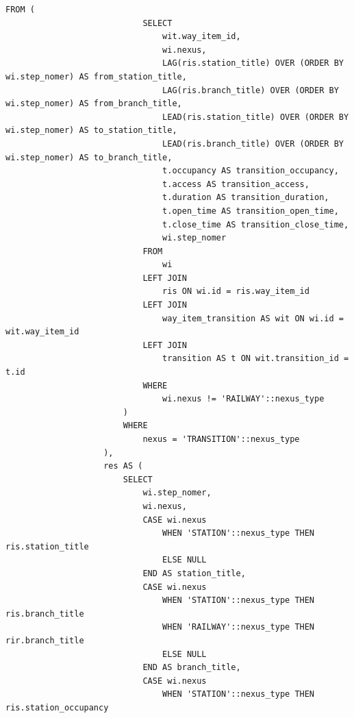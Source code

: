 \clearpage

\begin{lstlisting}[label=lst:get_route_json_by_id:3,caption=Реализация функции получения маршрута (часть 3),firstnumber=90]
                        FROM (
                            SELECT
                                wit.way_item_id,
                                wi.nexus,
                                LAG(ris.station_title) OVER (ORDER BY wi.step_nomer) AS from_station_title,
                                LAG(ris.branch_title) OVER (ORDER BY wi.step_nomer) AS from_branch_title,
                                LEAD(ris.station_title) OVER (ORDER BY wi.step_nomer) AS to_station_title,
                                LEAD(ris.branch_title) OVER (ORDER BY wi.step_nomer) AS to_branch_title,
                                t.occupancy AS transition_occupancy,
                                t.access AS transition_access,
                                t.duration AS transition_duration,
                                t.open_time AS transition_open_time,
                                t.close_time AS transition_close_time,
                                wi.step_nomer
                            FROM
                                wi
                            LEFT JOIN
                                ris ON wi.id = ris.way_item_id
                            LEFT JOIN
                                way_item_transition AS wit ON wi.id = wit.way_item_id
                            LEFT JOIN
                                transition AS t ON wit.transition_id = t.id
                            WHERE
                                wi.nexus != 'RAILWAY'::nexus_type
                        )
                        WHERE
                            nexus = 'TRANSITION'::nexus_type
                    ),
                    res AS (
                        SELECT
                            wi.step_nomer,
                            wi.nexus,
                            CASE wi.nexus
                                WHEN 'STATION'::nexus_type THEN ris.station_title
                                ELSE NULL
                            END AS station_title,
                            CASE wi.nexus
                                WHEN 'STATION'::nexus_type THEN ris.branch_title
                                WHEN 'RAILWAY'::nexus_type THEN rir.branch_title
                                ELSE NULL
                            END AS branch_title,
                            CASE wi.nexus
                                WHEN 'STATION'::nexus_type THEN ris.station_occupancy

\end{lstlisting}
